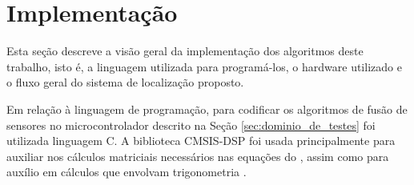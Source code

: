 \documentclass[acronym, symbols, table, deposito]{fei}
\begin{document}
%	
%		
%		
%		
		
	\section{Implementação}
	
		Esta seção descreve a visão geral da implementação dos algoritmos deste trabalho, isto é, a linguagem utilizada para programá-los, o hardware utilizado e o fluxo geral do sistema de localização proposto.
		
		Em relação à linguagem de programação, para codificar os algoritmos de fusão de sensores no microcontrolador descrito na Seção \ref{sec:dominio_de_testes} foi utilizada linguagem C. A biblioteca CMSIS-DSP foi usada principalmente para auxiliar nos cálculos matriciais necessários nas equações do , assim como para auxílio em cálculos que envolvam trigonometria \cite{cmsis_dsp}.
		
\end{document}
